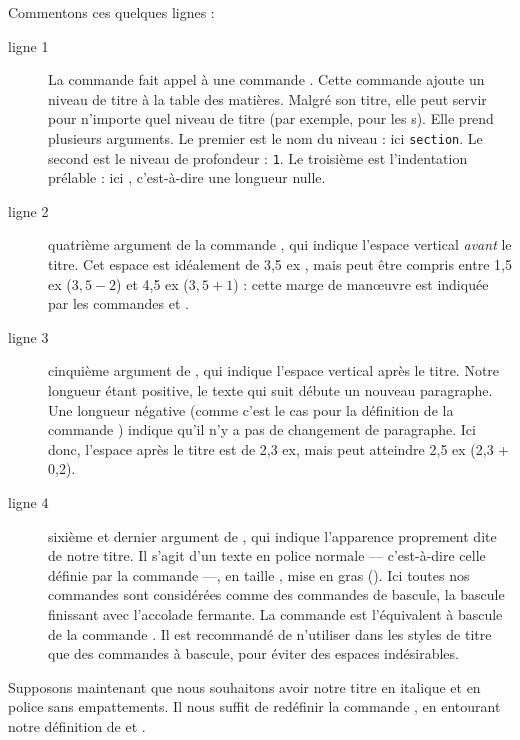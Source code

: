 Commentons ces quelques lignes :

\begin{description}
\item[ligne 1]La commande  fait appel à une commande . Cette commande ajoute  un niveau de titre à la table des matières. Malgré son titre, elle peut servir pour n'importe quel niveau de titre (par exemple, pour les s). Elle prend plusieurs arguments. Le premier est le nom du niveau : ici \verb|section|. Le second est le niveau de profondeur : \verb|1|. Le troisième est l'indentation prélable : ici , c'est-à-dire une longueur nulle.

\item[ligne 2] quatrième argument de la commande , qui indique l'espace vertical \emph{avant} le titre. Cet espace est idéalement de 3,5 ex , mais peut être compris entre 1,5 ex ($3,5 - 2$) et 4,5 ex ($3,5 + 1$) :  cette marge de manœuvre est indiquée par les commandes   et .
\item[ligne 3] cinquième argument de , qui indique l'espace vertical après le titre. Notre longueur étant positive, le texte qui suit débute un nouveau paragraphe. Une longueur négative (comme c'est le cas pour la définition de la commande ) indique qu'il n'y a pas de changement de paragraphe. Ici donc, l'espace après le titre est de 2,3 ex, mais peut atteindre 2,5 ex (2,3 + 0,2).
\item[ligne 4] sixième et dernier argument de , qui indique l'apparence proprement dite de notre titre. Il s'agit d'un texte en police normale --- c'est-à-dire celle définie par la commande  ---, en taille , mise en gras (). Ici toutes nos commandes sont considérées comme des commandes de bascule, la bascule finissant avec l'accolade fermante. La commande  est l'équivalent à bascule de la commande . Il est recommandé de n'utiliser dans les styles de titre que des commandes à bascule, pour éviter des espaces indésirables.\label{bfseries}
\end{description}

Supposons maintenant que nous souhaitons avoir notre titre en italique et en police sans empattements. Il nous suffit de redéfinir la commande , en entourant notre définition de  et .

